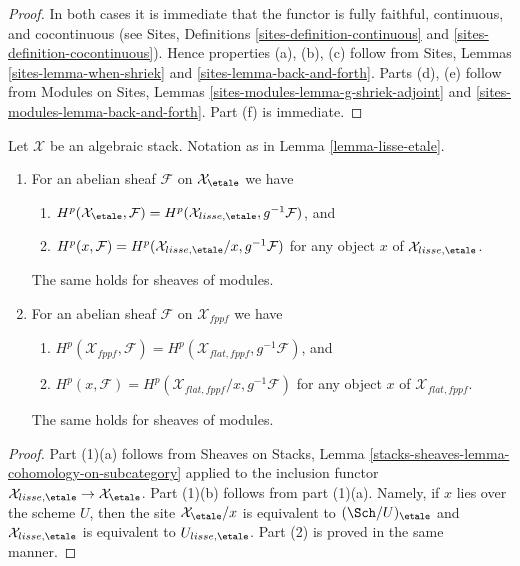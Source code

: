 \begin{proof}
In both cases it is immediate that the functor is fully faithful,
continuous, and cocontinuous (see
Sites, Definitions \ref{sites-definition-continuous} and
\ref{sites-definition-cocontinuous}).
Hence properties (a), (b), (c) follow from
Sites, Lemmas \ref{sites-lemma-when-shriek} and
\ref{sites-lemma-back-and-forth}.
Parts (d), (e) follow from
Modules on Sites, Lemmas \ref{sites-modules-lemma-g-shriek-adjoint} and
\ref{sites-modules-lemma-back-and-forth}.
Part (f) is immediate.
\end{proof}

\begin{lemma}
\label{lemma-lisse-etale-cohomology}
Let $\mathcal{X}$ be an algebraic stack. Notation as in
Lemma \ref{lemma-lisse-etale}.
\begin{enumerate}
\item For an abelian sheaf $\mathcal{F}$ on $\mathcal{X}_\etale$ we have
\begin{enumerate}
\item $H^p(\mathcal{X}_\etale, \mathcal{F}) =
H^p(\mathcal{X}_{lisse,\etale}, g^{-1}\mathcal{F})$, and
\item $H^p(x, \mathcal{F}) =
H^p(\mathcal{X}_{lisse,\etale}/x, g^{-1}\mathcal{F})$
for any object $x$ of $\mathcal{X}_{lisse,\etale}$.
\end{enumerate}
The same holds for sheaves of modules.
\item For an abelian sheaf $\mathcal{F}$ on $\mathcal{X}_{fppf}$ we have
\begin{enumerate}
\item $H^p(\mathcal{X}_{fppf}, \mathcal{F}) =
H^p(\mathcal{X}_{flat,fppf}, g^{-1}\mathcal{F})$, and
\item $H^p(x, \mathcal{F}) =
H^p(\mathcal{X}_{flat,fppf}/x, g^{-1}\mathcal{F})$
for any object $x$ of $\mathcal{X}_{flat,fppf}$.
\end{enumerate}
The same holds for sheaves of modules.
\end{enumerate}
\end{lemma}

\begin{proof}
Part (1)(a) follows from Sheaves on Stacks, Lemma
\ref{stacks-sheaves-lemma-cohomology-on-subcategory} applied to the inclusion
functor $\mathcal{X}_{lisse,\etale} \to \mathcal{X}_\etale$.
Part (1)(b) follows from part (1)(a). Namely, if $x$ lies over the
scheme $U$, then the site $\mathcal{X}_\etale/x$ is equivalent
to $(\Sch/U)_\etale$ and $\mathcal{X}_{lisse,\etale}$ is equivalent
to $U_{lisse,\etale}$. Part (2) is proved in the same manner.
\end{proof}


